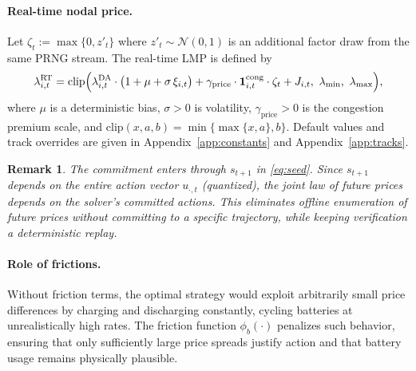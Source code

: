 \documentclass[11pt]{article}
\newtheorem{remark}{Remark}
\begin{document}
\paragraph{Real-time nodal price.}
Let $\zeta_t:=\max\{0,z'_t\}$ where $z'_t\sim\mathcal{N}(0,1)$ is an additional factor draw from the same PRNG stream. The real-time LMP is defined by
\begin{equation}\label{eq:lmp}
\lambda^{\mathrm{RT}}_{i,t}
=
\mathrm{clip}\Bigl(
\lambda^{\mathrm{DA}}_{i,t}\cdot\bigl(1+\mu+\sigma\,\xi_{i,t}\bigr)
+
\gamma_{\mathrm{price}}\cdot \mathbf{1}^{\mathrm{cong}}_{i,t}\cdot \zeta_t
+
J_{i,t},
\ \lambda_{\min},\ \lambda_{\max}
\Bigr),
\end{equation}
where $\mu$ is a deterministic bias, $\sigma>0$ is volatility, $\gamma_{\mathrm{price}}>0$ is the congestion premium scale, and $\mathrm{clip}(x,a,b)=\min\{\max\{x,a\},b\}$. Default values and track overrides are given in Appendix~\ref{app:constants} and Appendix~\ref{app:tracks}.

\begin{remark}
The commitment enters through $s_{t+1}$ in \eqref{eq:seed}. Since $s_{t+1}$ depends on the entire action vector $u_{\cdot,t}$ (quantized), the joint law of future prices depends on the solver's committed actions. This eliminates offline enumeration of future prices without committing to a specific trajectory, while keeping verification a deterministic replay.
\end{remark}

\paragraph{Role of frictions.}
Without friction terms, the optimal strategy would exploit arbitrarily small price differences by charging and discharging constantly, cycling batteries at unrealistically high rates. The friction function $\phi_b(\cdot)$ penalizes such behavior, ensuring that only sufficiently large price spreads justify action and that battery usage remains physically plausible.
\end{document}
